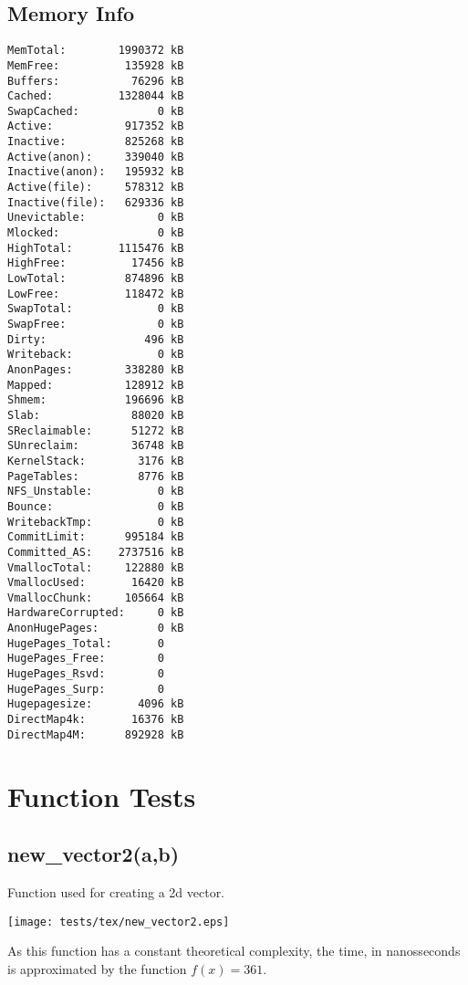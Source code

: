 \documentclass{article}
\begin{document}
\subsection{Memory Info}
\begin{verbatim}
MemTotal:        1990372 kB
MemFree:          135928 kB
Buffers:           76296 kB
Cached:          1328044 kB
SwapCached:            0 kB
Active:           917352 kB
Inactive:         825268 kB
Active(anon):     339040 kB
Inactive(anon):   195932 kB
Active(file):     578312 kB
Inactive(file):   629336 kB
Unevictable:           0 kB
Mlocked:               0 kB
HighTotal:       1115476 kB
HighFree:          17456 kB
LowTotal:         874896 kB
LowFree:          118472 kB
SwapTotal:             0 kB
SwapFree:              0 kB
Dirty:               496 kB
Writeback:             0 kB
AnonPages:        338280 kB
Mapped:           128912 kB
Shmem:            196696 kB
Slab:              88020 kB
SReclaimable:      51272 kB
SUnreclaim:        36748 kB
KernelStack:        3176 kB
PageTables:         8776 kB
NFS_Unstable:          0 kB
Bounce:                0 kB
WritebackTmp:          0 kB
CommitLimit:      995184 kB
Committed_AS:    2737516 kB
VmallocTotal:     122880 kB
VmallocUsed:       16420 kB
VmallocChunk:     105664 kB
HardwareCorrupted:     0 kB
AnonHugePages:         0 kB
HugePages_Total:       0
HugePages_Free:        0
HugePages_Rsvd:        0
HugePages_Surp:        0
Hugepagesize:       4096 kB
DirectMap4k:       16376 kB
DirectMap4M:      892928 kB
\end{verbatim}
\section{Function Tests}
\subsection{new\_vector2(a,b)}
Function used for creating a 2d vector.


\texttt{[image: tests/tex/new\_vector2.eps]}

As this function has a constant theoretical
complexity, the time, in nanosseconds is 
approximated by the function $f(x)=361$.
\end{document}
